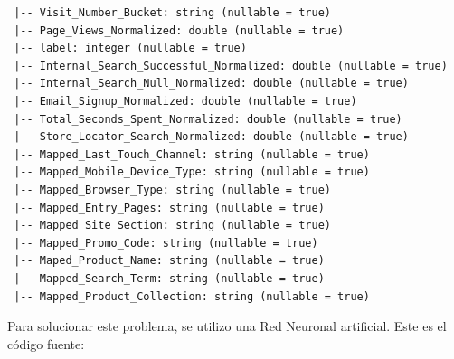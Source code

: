 \documentclass{article}
\begin{document}
\begin{lstlisting}
 |-- Visit_Number_Bucket: string (nullable = true)
 |-- Page_Views_Normalized: double (nullable = true)
 |-- label: integer (nullable = true)
 |-- Internal_Search_Successful_Normalized: double (nullable = true)
 |-- Internal_Search_Null_Normalized: double (nullable = true)
 |-- Email_Signup_Normalized: double (nullable = true)
 |-- Total_Seconds_Spent_Normalized: double (nullable = true)
 |-- Store_Locator_Search_Normalized: double (nullable = true)
 |-- Mapped_Last_Touch_Channel: string (nullable = true)
 |-- Mapped_Mobile_Device_Type: string (nullable = true)
 |-- Mapped_Browser_Type: string (nullable = true)
 |-- Mapped_Entry_Pages: string (nullable = true)
 |-- Mapped_Site_Section: string (nullable = true)
 |-- Mapped_Promo_Code: string (nullable = true)
 |-- Maped_Product_Name: string (nullable = true)
 |-- Mapped_Search_Term: string (nullable = true)
 |-- Mapped_Product_Collection: string (nullable = true)
\end{lstlisting}

Para solucionar este problema, se utilizo una Red Neuronal artificial. Este es el código fuente:
\end{document}
